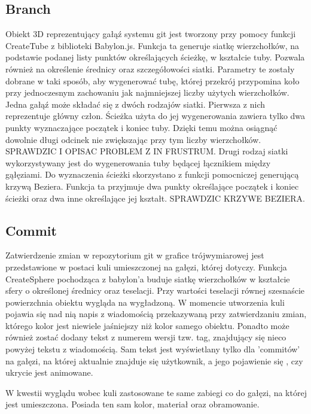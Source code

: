 \documentclass[11pt,a4paper,polish,thesis]{dcsbook}
\begin{document}
	\subsection{Branch}
	Obiekt 3D reprezentujący gałąź systemu git jest tworzony przy pomocy funkcji CreateTube z biblioteki Babylon.js. 
	Funkcja ta generuje siatkę wierzchołków, na podstawie podanej listy punktów określających ścieżkę, w kształcie tuby. Pozwala również na określenie średnicy oraz
	szczegółowości siatki. Parametry te zostały dobrane w taki sposób, aby wygenerować tubę, której przekrój przypomina koło przy jednoczesnym zachowaniu jak najmniejszej liczby użytych wierzchołków. Jedna gałąź może składać się z dwóch rodzajów siatki. Pierwsza z nich reprezentuje główny człon. Ścieżka użyta do jej wygenerowania zawiera tylko dwa punkty wyznaczające początek i koniec tuby. Dzięki temu można osiągnąć dowolnie długi odcinek nie zwiększając przy tym liczby wierzchołków. SPRAWDZIC I OPISAC PROBLEM Z IN FRUSTRUM. Drugi rodzaj siatki wykorzystywany jest do wygenerowania tuby będącej łącznikiem między gąłęziami. Do wyznaczenia ścieżki skorzystano z funkcji pomocniczej generującą krzywą Beziera. Funkcja ta przyjmuje dwa punkty określające początek i koniec ścieżki oraz dwa inne określające jej kształt. SPRAWDZIC KRZYWE BEZIERA. 

	\subsection{Commit}
	Zatwierdzenie zmian w repozytorium git w grafice trójwymiarowej jest przedstawione w postaci kuli umieszczonej na gałęzi, której dotyczy. Funkcja CreateSphere pochodząca z babylon'a buduje siatkę wierzchołków w kształcie sfery o określonej średnicy oraz teselacji. Przy wartości teselacji równej szesnaście powierzchnia obiektu wygląda na wygładzoną. W momencie utworzenia kuli  pojawia się nad nią napis z wiadomością przekazywaną przy zatwierdzaniu zmian, którego kolor jest niewiele jaśniejszy niż kolor samego obiektu. Ponadto może również zostać dodany tekst z numerem wersji tzw. tag, znajdujący się nieco powyżej tekstu z wiadomością. Sam tekst jest wyświetlany tylko dla 'commitów' na gałęzi, na której aktualnie znajduje się użytkownik, a jego pojawienie się , czy ukrycie jest animowane. 

	 W kwestii wyglądu wobec kuli zastosowane te same zabiegi co do gałęzi, na której jest umieszczona. Posiada ten sam kolor, materiał oraz obramowanie. 
 
\end{document}
